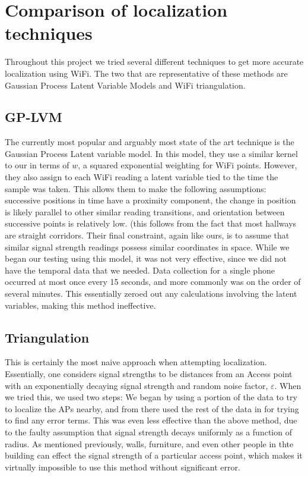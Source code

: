 \section{Comparison of localization techniques}
Throughout this project we tried several different techniques to get more accurate
localization using WiFi.  The two that are representative of these methods are 
Gaussian Process Latent Variable Models and WiFi triangulation.  
\subsection{GP-LVM}
The currently most popular and arguably most state of the art technique
is the Gaussian Process Latent variable model.  In this model, they use
a similar kernel to our in terms of $w$, a squared exponential weighting 
for WiFi points.  However, they also assign to each WiFi reading a latent variable
tied to the time the sample was taken.  This allows them to make the following 
assumptions: successive positions in time have a proximity component, the change in 
position is likely parallel to other similar reading transitions, and orientation
between successive points is relatively low.  (this follows from the fact that 
most hallways are straight corridors. Their final constraint, again like ours, is 
to assume that similar signal strength readings possess similar coordinates in space.
While we began our testing using this model, it was not very effective, since we 
did not have the temporal data that we needed.  Data collection for a single phone
occurred at most once every 15 seconds, and more commonly was on the order of several 
minutes.  This essentially zeroed out any calculations involving the latent variables,
making this method ineffective.

\subsection{Triangulation}
This is certainly the most naive approach when attempting localization. Essentially, 
one considers signal strengths to be distances from an Access point with an exponentially 
decaying signal strength and random noise factor, $\varepsilon$. When we tried this, we used two steps:
We began by using a portion of the data to try to localize the APs nearby, and from there used the
rest of the data in for trying to find any error terms.  This was even less effective than the 
above method, due to the faulty assumption that signal strength decays uniformly as a function
of radius.  As mentioned previously, walls, furniture, and even other people in thte building can 
effect the signal strength of a particular access point, which makes it virtually impossible to
use this method without significant error.
